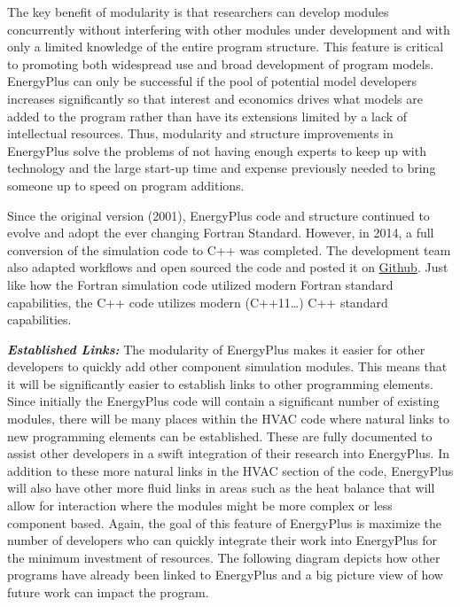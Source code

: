 The key benefit of modularity is that researchers can develop modules concurrently without interfering with other modules under development and with only a limited knowledge of the entire program structure. This feature is critical to promoting both widespread use and broad development of program models. EnergyPlus can only be successful if the pool of potential model developers increases significantly so that interest and economics drives what models are added to the program rather than have its extensions limited by a lack of intellectual resources. Thus, modularity and structure improvements in EnergyPlus solve the problems of not having enough experts to keep up with technology and the large start-up time and expense previously needed to bring someone up to speed on program additions.

Since the original version (2001), EnergyPlus code and structure continued to evolve and adopt the ever changing Fortran Standard. However, in 2014, a full conversion of the simulation code to C++ was completed. The development team also adapted workflows and open sourced the code and posted it on \href{https://github.com/NREL/EnergyPlus}{Github}. Just like how the Fortran simulation code utilized modern Fortran standard capabilities, the C++ code utilizes modern (C++11\ldots{}) C++ standard capabilities.

\textbf{\emph{Established Links:}} The modularity of EnergyPlus makes it easier for other developers to quickly add other component simulation modules. This means that it will be significantly easier to establish links to other programming elements. Since initially the EnergyPlus code will contain a significant number of existing modules, there will be many places within the HVAC code where natural links to new programming elements can be established. These are fully documented to assist other developers in a swift integration of their research into EnergyPlus. In addition to these more natural links in the HVAC section of the code, EnergyPlus will also have other more fluid links in areas such as the heat balance that will allow for interaction where the modules might be more complex or less component based. Again, the goal of this feature of EnergyPlus is maximize the number of developers who can quickly integrate their work into EnergyPlus for the minimum investment of resources. The following diagram depicts how other programs have already been linked to EnergyPlus and a big picture view of how future work can impact the program.

